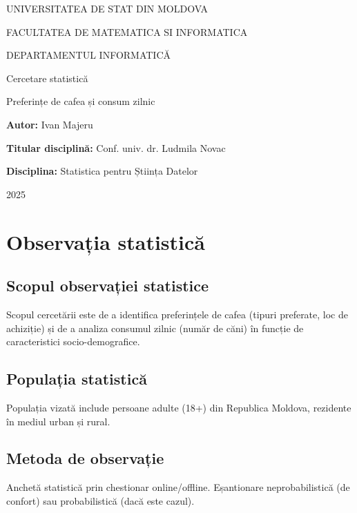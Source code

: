 \documentclass[12pt,a4paper]{report}
\newcommand{\Universitate}{UNIVERSITATEA DE STAT DIN MOLDOVA}
\newcommand{\Facultate}{FACULTATEA DE MATEMATICA SI INFORMATICA}
\newcommand{\Departament}{DEPARTAMENTUL INFORMATICĂ}
\newcommand{\TitluProiect}{Preferințe de cafea și consum zilnic}
\newcommand{\Disciplina}{Statistica pentru Știința Datelor}
\newcommand{\Autor}{Ivan Majeru}
\newcommand{\Titular}{Conf. univ. dr. Ludmila Novac}
\newcommand{\An}{2025}
\begin{document}
\begin{titlepage}
  \centering
  {\Large \Universitate\par}
  {\large \Facultate\par}
  {\large \Departament\par}
  \vspace{2cm}
  {\LARGE Cercetare statistică\par}
  \vspace{0.5cm}
  {\Large \TitluProiect\par}
  \vspace{2.5cm}
  \begin{flushleft}
    \textbf{Autor:} \Autor\par
    \textbf{Titular disciplină:} \Titular\par
    \textbf{Disciplina:} \Disciplina\par
  \end{flushleft}
  \vfill
  {\An\par}
\end{titlepage}

\tableofcontents
\clearpage
{}

\section{Observația statistică}

\subsection{Scopul observației statistice}
Scopul cercetării este de a identifica preferințele de cafea (tipuri preferate, loc de achiziție) și de a analiza consumul zilnic (număr de căni) în funcție de caracteristici socio-demografice.

\subsection{Populația statistică}
Populația vizată include persoane adulte (18+) din Republica Moldova, rezidente în mediul urban și rural.

\subsection{Metoda de observație}
Anchetă statistică prin chestionar online/offline. Eșantionare neprobabilistică (de confort) sau probabilistică (dacă este cazul).
\end{document}
